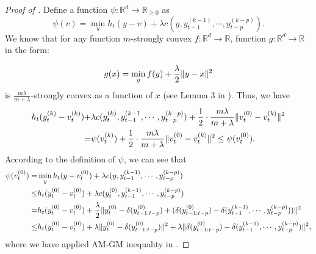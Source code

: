 \begin{proof}[Proof of ]

Define a function $\psi:\mathbb{R}^d\to\mathbb{R}_{\ge0}$ as 
\[\psi(v)=\min_yh_t(y-v)+\lambda c(y,y_{t-1}^{(k-1)},\cdots,y_{t-p}^{(k-p)}).\]
We know that for any function $m$-strongly convex $f:\mathbb{R}^d\to\mathbb{R}$, function $g:\mathbb{R}^d\to\mathbb{R}$ in the form: 

\begin{align}
    g(x)=\min_yf(y)+\frac{\lambda}{2}\|y-x\|^2\notag
\end{align}
is $\frac{m\lambda}{m+\lambda}$-strongly convex as a function of $x$ (see Lemma 3 in \citep{shi2020online}). Thus, we have\begin{subequations}
\begin{align}
     h_t(y_t^{(k)}-v_t^{(k)})+&\lambda c(y_t^{(k)},y_{t-1}^{(k-1},\cdots,y_{t-p}^{(k-p)})+\frac{1}{2}\cdot\frac{m\lambda}{m+\lambda}\|v_t^{(0)}-v_t^{(k)}\|^2\notag\\
=&\psi(v_t^{(k)})+\frac{1}{2}\cdot\frac{m\lambda}{m+\lambda}\|v_t^{(0)}-v_t^{(k)}\|^2\le\psi(v_t^{(0)}).\label{appendix.c.16.1}
\end{align}
\end{subequations}
According to the definition of $\psi$, we can see that
\begin{subequations}
\begin{align}
    \psi(v_t^{(0)})=&\min_yh_t(y-v_t^{(0)})+\lambda c(y,y_{t-1}^{(k-1)},\cdots,y_{t-p}^{(k-p)})\notag\\
\le&h_t(y_t^{(0)}-v_t^{(0)})+\lambda c(y_t^{(0)},y_{t-1}^{(k-1)},\cdots,y_{t-p}^{(k-p)})\notag\\
=&h_t(y_t^{(0)}-v_t^{(0)})+\frac{\lambda}{2}\|y_t^{(0)}-\delta(y_{t-1:t-p}^{(0)})+(\delta(y_{t-1:t-p}^{(0)})-\delta(y_{t-1}^{(k-1)},\cdots,y_{t-p}^{(k-p)}))\|^2\notag\\
\le&h_t(y_t^{(0)}-v_t^{(0)})+\lambda\|y_t^{(0)}-\delta(y_{t-1:t-p}^{(0)})\|^2+\lambda\|\delta(y_{t-1:t-p}^{(0)})-\delta(y_{t-1}^{(k-1)},\cdots,y_{t-p}^{(k-p)})\|^2,\label{appendix.c.16.2}
\end{align}
\end{subequations}
where we have applied AM-GM inequality in . 


\end{proof}
